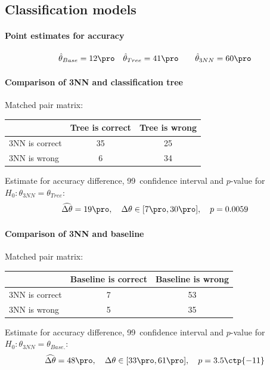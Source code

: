 \documentclass[11pt,fleqn]{article}
\begin{document}
\subsection{Classification models}

\paragraph{Point estimates for accuracy}

\begin{align*}
	& \hat \theta_{Base}= 12\pro 
	&& \hat \theta_{Tree} =41\pro 
	&&&\hat \theta_{3NN} = 60 \pro 
\end{align*}
\paragraph{Comparison of 3NN and classification tree}
Matched pair matrix:

\begin{table}[H]
	\centering
	\begin{tabular}{l|c c}
		&Tree is correct& Tree is wrong \\
		\hline
		3NN is correct &35& 25\\
		3NN is wrong& 6& 34
	\end{tabular}
\end{table}\noindent 
Estimate for accuracy difference, 99\pro\ confidence interval and \(p\)-value for \(H_0: \theta_{3NN}=\theta_{Tree}\):
\[
\widehat{\Delta \theta} = 19\pro,\quad  \Delta \theta\in[7\pro , 30\pro], \quad p = 0.0059 
\]

\paragraph{Comparison of 3NN and baseline}
Matched pair matrix:

\begin{table}[H]
	\centering
	\begin{tabular}{l|c c}
		&Baseline is correct& Baseline is wrong \\
		\hline
		3NN is correct &7& 53\\
		3NN is wrong& 5& 35
	\end{tabular}
\end{table}\noindent 
Estimate for accuracy difference, 99\pro\ confidence interval and \(p\)-value for \(H_0: \theta_{3NN}=\theta_{Base.}\):
\[
\widehat{\Delta \theta} = 48\pro,\quad  \Delta \theta\in[33\pro , 61\pro], \quad p = 3.5\ctp{-11}
\]
\end{document}
